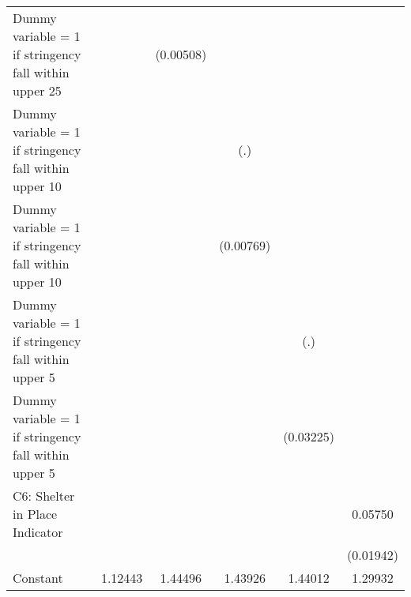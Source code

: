 \begin{table}[htbp]
\begin{tabular}{l*{5}{c}}
\addlinespace
Dummy variable = 1 if stringency fall within upper 25%
                    &                     &   (0.00508)         &                     &                     &                     \\
\addlinespace
Dummy variable = 1 if stringency fall within upper 10%
                    &                     &                     &         (.)         &                     &                     \\
\addlinespace
Dummy variable = 1 if stringency fall within upper 10%
                    &                     &                     &   (0.00769)         &                     &                     \\
\addlinespace
Dummy variable = 1 if stringency fall within upper 5%
                    &                     &                     &                     &         (.)         &                     \\
\addlinespace
Dummy variable = 1 if stringency fall within upper 5%
                    &                     &                     &                     &   (0.03225)         &                     \\
\addlinespace
C6: Shelter in Place Indicator&                     &                     &                     &                     &     0.05750\sym{***}\\
                    &                     &                     &                     &                     &   (0.01942)         \\
\addlinespace
Constant            &     1.12443\sym{***}&     1.44496\sym{***}&     1.43926\sym{***}&     1.44012\sym{***}&     1.29932\sym{***}\\

\end{tabular}
\end{table}
